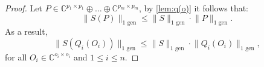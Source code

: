 \begin{proof}
Let $P \in \mathbb{C}^{p_1 \times p_1} \oplus \ldots \oplus  \mathbb{C}^{p_m \times p_m}$, by \autoref{lem:q(o)} it follows that:
\begin{equation}
  \lVert S(P) \rVert_{1 \text{ gen}} \leq \lVert S  \rVert_{1 \text{ gen}} \cdot \lVert P  \rVert_{1 \text{ gen}}.
\end{equation}
As a result, 
\begin{equation} \label{ineq:gen_trace_submultiplicative_O}
  \lVert S (Q_i (O_i)) \rVert_{1 \text{ gen}} \leq \lVert S  \rVert_{1 \text{ gen}} \cdot \lVert Q_i (O_i)  \rVert_{1 \text{ gen}},
\end{equation}
for all $O_i \in \mathbb{C}^{o_i \times o_i}$ and $1 \leq i \leq n$. 


\end{proof}
